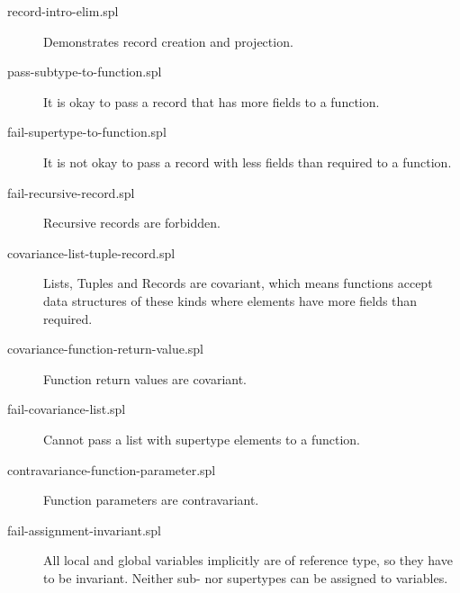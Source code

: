 \documentclass[a4paper]{article}
\begin{document}
\begin{description}

  \item[record-intro-elim.spl] Demonstrates record creation and projection.

  \item[pass-subtype-to-function.spl] It is okay to pass a record that has more
  fields to a function.

  \item[fail-supertype-to-function.spl] It is not okay to pass a record with
  less fields than required to a function.

  \item[fail-recursive-record.spl] Recursive records are forbidden.

  \item[covariance-list-tuple-record.spl] Lists, Tuples and Records are
  covariant, which means functions accept data structures of these kinds where
  elements have more fields than required.

  \item[covariance-function-return-value.spl] Function return values are
  covariant.

  \item[fail-covariance-list.spl] Cannot pass a list with supertype elements to
  a function.

  \item[contravariance-function-parameter.spl] Function parameters are
  contravariant.

  \item[fail-assignment-invariant.spl] All local and global variables implicitly
  are of reference type, so they have to be invariant.  Neither sub- nor
  supertypes can be assigned to variables.

\end{description}




\end{document}

